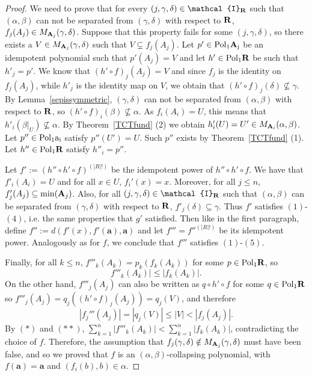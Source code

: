 \documentclass[11pt]{amsart}
\newcommand{\m}[1]{{\uppercase {\mathbf {#1}}}}
\newcommand{\vr}[1]{{\uppercase {\mathcal{#1}}}}
\newcommand{\poln}[2]{{\rm Pol_{#1}\m #2}}
\theoremstyle{definition}
\begin{document}
\begin{proof}
We need to prove that for every $(j,\gamma,\delta)\in\vr i_{\m r}$ such that $(\alpha,\beta)$ can not be separated from $(\gamma,\delta)$ with respect to $\m r$, $f_j(A_j)\in M_{\m a_j}(\gamma,\delta)$. Suppose that this property fails for some $(j,\gamma,\delta)$, so there exists a $V\in M_{\m a_j}(\gamma,\delta)$ such that $V\subsetneq f_j(A_j)$. Let $p'\in\poln{1}{a_j}$ be an idempotent polynomial such that $p'(A_j)=V$ and let $h'\in\poln{1}{r}$ be such that $h'_j=p'$. We know that $(h'\circ f)_j(A_j)=V$ and since $f_j$ is the identity on $f_j(A_j)$, while $h'_j$ is the identity map on $V$, we obtain that $(h'\circ f)_j(\delta)\nsubseteq\gamma$. By Lemma~\ref{sepissymmetric}, $(\gamma,\delta)$ can not be separated from $(\alpha,\beta)$ with respect to $\m r$, so $(h'\circ f)_i(\beta)\nsubseteq \alpha$. As $f_i(A_i)=U$, this means that $h'_i(\beta|_U)\nsubseteq \alpha$. By Theorem~\ref{TCTfund} (2) we obtain $h'_i(U)=U'\in M_{\m a_i}(\alpha,\beta)$. Let $p''\in\poln{1}{\m a_i}$ satisfy $p''(U')=U$. Such $p''$ exists by Theorem~\ref{TCTfund} (1). Let $h''\in\poln{1}{r}$ satisfy $h''_i=p''$. 

Let $f':=(h''\circ h'\circ f)^{(|R|!)}$ be the idempotent power of $h''\circ h'\circ f$. We have that $f'_i(A_i)=U$ and for all $x\in U$, $f_i'(x)=x$. Moreover, for all $j\leq n$, $f'_j(A_j)\subseteq\mathrm{min}(\m a_j)$. Also, for all $(j,\gamma,\delta)\in \vr i_{\m r}$ such that $(\alpha,\beta)$ can be separated from $(\gamma,\delta)$ with respect to $\m r$, $f'_j(\delta)\subseteq \gamma$. Thus $f'$ satisfies $(1)$-$(4)$, i.e. the same properties that $g'$ satisfied. Then like in the first paragraph, define $f'':=d(f'(x),f'(\mathbf{a}),\mathbf{a})$ and let $f'''=f''^{(|R|!)}$ be its idempotent power. Analogously as for $f$, we conclude that $f'''$ satisfies $(1)$-$(5)$. 

Finally, for all $k\leq n$, $f'''_k(A_k)=p_k(f_k(A_k))$ for some $p\in \poln{1}{r}$, so 
\begin{equation}\tag{*}
f'''_k(A_k)|\leq |f_k(A_k)|.
\end{equation}
On the other hand, $f'''_j(A_j)$ can also be written as $q\circ h'\circ f$ for some $q\in\poln{1}{r}$ so $f'''_j(A_j)=q_j( (h'\circ f)_j(A_j))=q_j(V)$, and therefore
\begin{equation}\tag{**}
|f_j'''(A_j)|=|q_j(V)|\leq |V|<|f_j(A_j)|.
\end{equation}
By $(*)$ and $(**)$, $\sum\limits_{k=1}^n|f'''_k(A_k)|<\sum\limits_{k=1}^n|f_k(A_k)|$, contradicting the choice of $f$. Therefore, the assumption that $f_j(\gamma,\delta)\notin M_{\m a_j}(\gamma,\delta)$ must have been false, and so we proved that $f$ is an $(\alpha,\beta)$-collapsing polynomial, with $f(\mathbf{a})=\mathbf{a}$ and $(f_i(b),b)\in \alpha$.
\end{proof}
\end{document}
